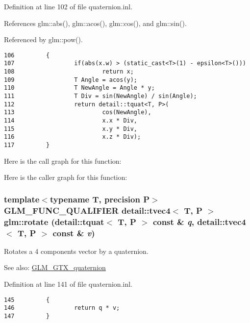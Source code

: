Definition at line 102 of file quaternion.inl.

References glm::abs(), glm::acos(), glm::cos(), and glm::sin().

Referenced by glm::pow().

\begin{Code}\begin{verbatim}106         {
107                 if(abs(x.w) > (static_cast<T>(1) - epsilon<T>()))
108                         return x;
109                 T Angle = acos(y);
110                 T NewAngle = Angle * y;
111                 T Div = sin(NewAngle) / sin(Angle);
112                 return detail::tquat<T, P>(
113                         cos(NewAngle),
114                         x.x * Div,
115                         x.y * Div,
116                         x.z * Div);
117         }
\end{verbatim}
\end{Code}




Here is the call graph for this function:

Here is the caller graph for this function:\hypertarget{group__gtx__quaternion_g9fd82cf89bc167ca12752f03a99329a4}{
\subsubsection[rotate]{\setlength{\rightskip}{0pt plus 5cm}template$<$typename T, precision P$>$ GLM\_\-FUNC\_\-QUALIFIER detail::tvec4$<$ T, P $>$ glm::rotate (detail::tquat$<$ T, P $>$ const \& {\em q}, \/  detail::tvec4$<$ T, P $>$ const \& {\em v})}}
\label{group__gtx__quaternion_g9fd82cf89bc167ca12752f03a99329a4}


Rotates a 4 components vector by a quaternion.

\begin{Desc}
\item[See also:]\hyperlink{group__gtx__quaternion}{GLM\_\-GTX\_\-quaternion} \end{Desc}


Definition at line 141 of file quaternion.inl.

\begin{Code}\begin{verbatim}145         {
146                 return q * v;
147         }
\end{verbatim}
\end{Code}


